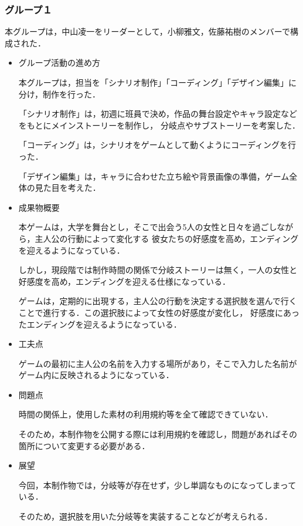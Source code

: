 \subsubsection{グループ１}
    
    本グループは，中山凌一をリーダーとして，小柳雅文，佐藤祐樹のメンバーで構成された．

    \begin{itemize}
        \item グループ活動の進め方
        

        本グループは，担当を「シナリオ制作」「コーディング」「デザイン編集」に分け，制作を行った．

        「シナリオ制作」は，初週に班員で決め，作品の舞台設定やキャラ設定などをもとにメインストーリーを制作し，
        分岐点やサブストーリーを考案した．

        「コーディング」は，シナリオをゲームとして動くようにコーディングを行った．

        「デザイン編集」は，キャラに合わせた立ち絵や背景画像の準備，ゲーム全体の見た目を考えた．

        \item 成果物概要
        

        本ゲームは，大学を舞台とし，そこで出会う5人の女性と日々を過ごしながら，主人公の行動によって変化する
        彼女たちの好感度を高め，エンディングを迎えるようになっている．

        しかし，現段階では制作時間の関係で分岐ストーリーは無く，一人の女性と好感度を高め，エンディングを迎える仕様になっている．
        
        ゲームは，定期的に出現する，主人公の行動を決定する選択肢を選んで行くことで進行する．この選択肢によって女性の好感度が変化し，
        好感度にあったエンディングを迎えるようになっている．

        \item 工夫点
        

        ゲームの最初に主人公の名前を入力する場所があり，そこで入力した名前がゲーム内に反映されるようになっている．

        \item 問題点
        

        時間の関係上，使用した素材の利用規約等を全て確認できていない．

        そのため，本制作物を公開する際には利用規約を確認し，問題があればその箇所について変更する必要がある．

        \item 展望
        

        今回，本制作物では，分岐等が存在せず，少し単調なものになってしまっている．

        そのため，選択肢を用いた分岐等を実装することなどが考えられる．

    \end{itemize}
